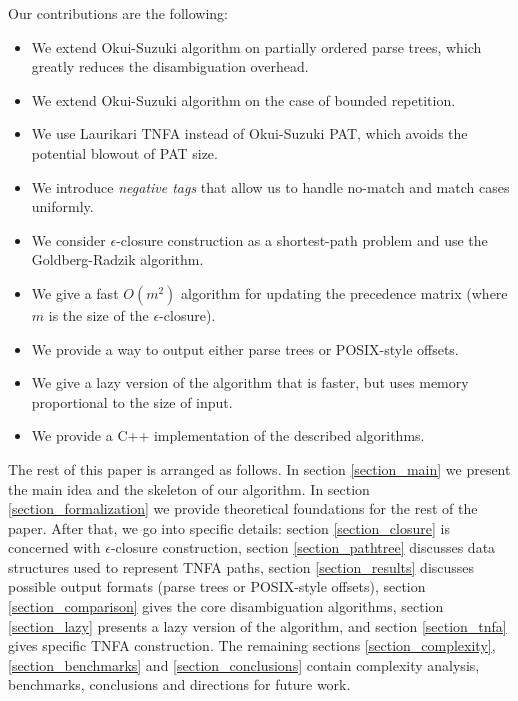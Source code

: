 \documentclass[AMA,STIX1COL]{WileyNJD-v2}
\begin{document}
Our contributions are the following:
\begin{itemize}[itemsep=0.2em, topsep=0.5em]

    \item We extend Okui-Suzuki algorithm on partially ordered parse trees,
        which greatly reduces the disambiguation overhead.

    \item We extend Okui-Suzuki algorithm on the case of bounded repetition.

    \item We use Laurikari TNFA instead of Okui-Suzuki PAT, which avoids the potential blowout of PAT size.

    \item We introduce \emph{negative tags} that allow us to handle no-match and match cases uniformly.

    \item We consider $\epsilon$-closure construction as a shortest-path problem and use the Goldberg-Radzik algorithm.

    \item We give a fast $O(m^2)$ algorithm for updating the precedence matrix (where $m$ is the size of the $\epsilon$-closure).

    \item We provide a way to output either parse trees or POSIX-style offsets.

    \item We give a lazy version of the algorithm that is faster, but uses memory proportional to the size of input.

    \item We provide a C++ implementation of the described algorithms.
    \\[-0.5em]
\end{itemize}

The rest of this paper is arranged as follows.
In section \ref{section_main} we present the main idea and the skeleton of our algorithm.
In section \ref{section_formalization} we provide theoretical foundations for the rest of the paper.
After that, we go into specific details:
section \ref{section_closure} is concerned with $\epsilon$-closure construction,
section \ref{section_pathtree} discusses data structures used to represent TNFA paths,
section \ref{section_results} discusses possible output formats (parse trees or POSIX-style offsets),
section \ref{section_comparison} gives the core disambiguation algorithms,
section \ref{section_lazy} presents a lazy version of the algorithm,
and section \ref{section_tnfa} gives specific TNFA construction.
The remaining sections \ref{section_complexity}, \ref{section_benchmarks} and \ref{section_conclusions}
contain complexity analysis, benchmarks, conclusions and directions for future work.
\end{document}
